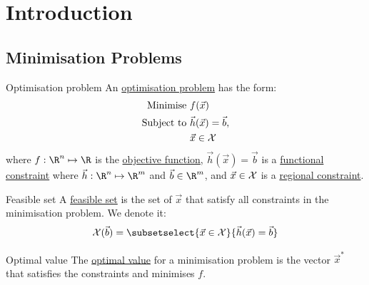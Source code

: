 \documentclass[../Main.tex]{subfiles}
\begin{document}
\section{Introduction}
\subsection{Minimisation Problems}
\begin{definition}{Optimisation problem}
    An \underline{optimisation problem} has the form:
    \begin{align*}
        \text{Minimise } & f(\vec{x}) \\
        \text{Subject to } & \vec{h}(\vec{x}) = \vec{b}, \\
        & \vec{x} \in \mathcal{X}
    \end{align*}
    where $f : \R^n \mapsto \R$ is the \underline{objective function}, $\vec{h}(\vec{x}) = \vec{b}$ is a \underline{functional constraint} where $\vec{h} : \R^n \mapsto \R^m$ and $\vec{b} \in \R^m$, and $\vec{x} \in \mathcal{X}$ is a \underline{regional constraint}.
\end{definition}
\begin{definition}{Feasible set}
    A \underline{feasible set} is the set of $\vec{x}$ that satisfy all constraints in the minimisation problem. We denote it:
    \begin{equation*}
        \Xset(\vec{b}) = \subsetselect{\vec{x} \in \Xset}{\vec{h}(\vec{x}) = \vec{b}}
    \end{equation*}
\end{definition}
\begin{definition}{Optimal value}
    The \underline{optimal value} for a minimisation problem is the vector $\vec{x}^*$ that satisfies the constraints and minimises $f$.
\end{definition}
\end{document}
